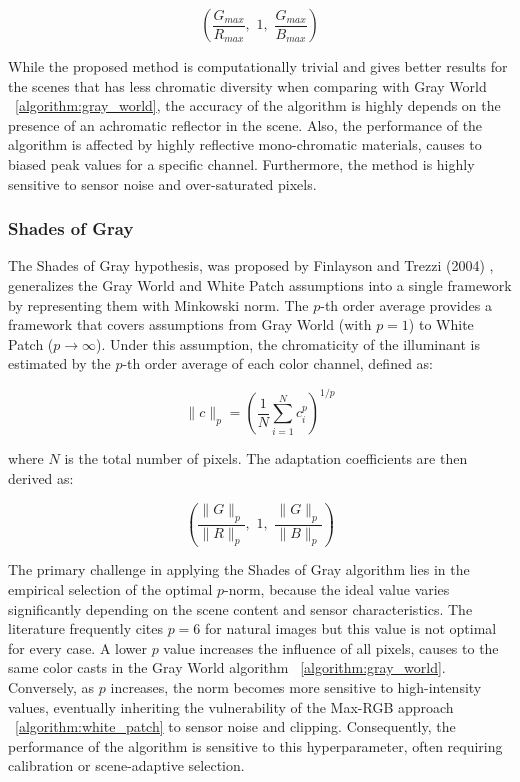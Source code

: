 \[
\left( \frac{G_{max}}{R_{max}}, \,\, 1, \,\, \frac{G_{max}}{B_{max}} \right)
\]

While the proposed method is computationally trivial and gives better results for the scenes that has less chromatic diversity when comparing with Gray World ~\ref{algorithm:gray_world}, the accuracy of the algorithm is highly depends on the presence of an achromatic reflector in the scene. Also, the performance of the algorithm is affected by highly reflective mono-chromatic materials, causes to biased peak values for a specific channel. Furthermore, the method is highly sensitive to sensor noise and over-saturated pixels.

\subsubsection{Shades of Gray}
\label{algoritm:shades_of_gray}
The Shades of Gray hypothesis, was proposed by Finlayson and Trezzi (2004) \cite{shades_of_gray}, generalizes the Gray World and White Patch assumptions into a single framework by representing them with Minkowski norm. The $p$-th order average provides a framework that covers assumptions from Gray World (with $p=1$) to White Patch ($p \to \infty$). Under this assumption, the chromaticity of the illuminant is estimated by the $p$-th order average of each color channel, defined as:

\begin{equation}
\|c\|_p = \left( \frac{1}{N} \sum_{i=1}^{N} c_i^p \right)^{1/p}
\end{equation}

where $N$ is the total number of pixels. The adaptation coefficients are then derived as:

\[
\left( \frac{\|G\|_p}{\|R\|_p}, \,\, 1, \,\, \frac{\|G\|_p}{\|B\|_p} \right)
\]

The primary challenge in applying the Shades of Gray algorithm lies in the empirical selection of the optimal $p$-norm, because the ideal value varies significantly depending on the scene content and sensor characteristics. The literature frequently cites $p=6$ for natural images but this value is not optimal for every case. A lower $p$ value increases the influence of all pixels, causes to the same color casts in the Gray World algorithm ~\ref{algorithm:gray_world}. Conversely, as $p$ increases, the norm becomes more sensitive to high-intensity values, eventually inheriting the vulnerability of the Max-RGB approach ~\ref{algorithm:white_patch} to sensor noise and clipping. Consequently, the performance of the algorithm is sensitive to this hyperparameter, often requiring calibration or scene-adaptive selection.


